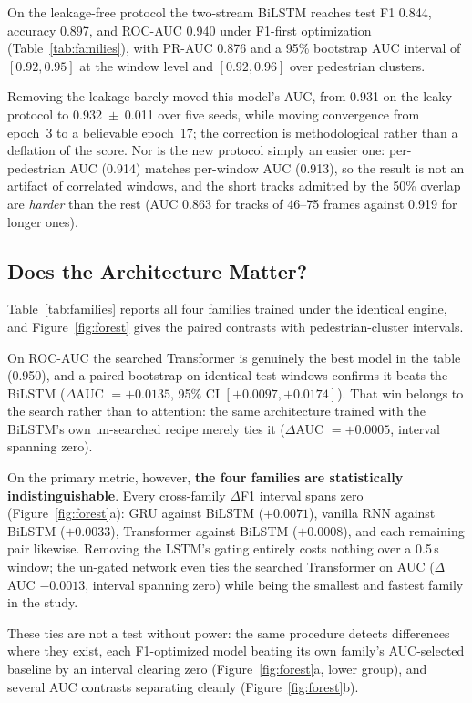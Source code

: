 \documentclass[mti,article,submit,moreauthors]{Definitions/mdpi}
\begin{document}
On the leakage-free protocol the two-stream BiLSTM reaches test F1 0.844, accuracy 0.897, and ROC-AUC 0.940 under F1-first optimization (Table~\ref{tab:families}), with PR-AUC 0.876 and a 95\% bootstrap AUC interval of $[0.92, 0.95]$ at the window level and $[0.92, 0.96]$ over pedestrian clusters.

Removing the leakage barely moved this model's AUC, from 0.931 on the leaky protocol to 0.932~$\pm$~0.011 over five seeds, while moving convergence from epoch~3 to a believable epoch~17; the correction is methodological rather than a deflation of the score. Nor is the new protocol simply an easier one: per-pedestrian AUC (0.914) matches per-window AUC (0.913), so the result is not an artifact of correlated windows, and the short tracks admitted by the 50\% overlap are \emph{harder} than the rest (AUC 0.863 for tracks of 46--75 frames against 0.919 for longer ones).

\subsection{Does the Architecture Matter?}
\label{sec:architecture}

Table~\ref{tab:families} reports all four families trained under the identical engine, and Figure~\ref{fig:forest} gives the paired contrasts with pedestrian-cluster intervals.

On ROC-AUC the searched Transformer is genuinely the best model in the table (0.950), and a paired bootstrap on identical test windows confirms it beats the BiLSTM ($\Delta$AUC $= +0.0135$, 95\% CI $[+0.0097, +0.0174]$). That win belongs to the search rather than to attention: the same architecture trained with the BiLSTM's own un-searched recipe merely ties it ($\Delta$AUC $= +0.0005$, interval spanning zero).

On the primary metric, however, \textbf{the four families are statistically indistinguishable}. Every cross-family $\Delta$F1 interval spans zero (Figure~\ref{fig:forest}a): GRU against BiLSTM ($+0.0071$), vanilla RNN against BiLSTM ($+0.0033$), Transformer against BiLSTM ($+0.0008$), and each remaining pair likewise. Removing the LSTM's gating entirely costs nothing over a 0.5\,s window; the un-gated network even ties the searched Transformer on AUC ($\Delta$AUC $-0.0013$, interval spanning zero) while being the smallest and fastest family in the study.

These ties are not a test without power: the same procedure detects differences where they exist, each F1-optimized model beating its own family's AUC-selected baseline by an interval clearing zero (Figure~\ref{fig:forest}a, lower group), and several AUC contrasts separating cleanly (Figure~\ref{fig:forest}b).
\end{document}
